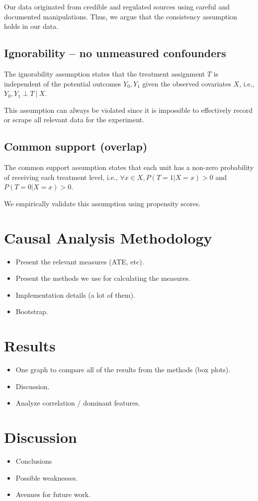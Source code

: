 \documentclass[11pt]{article}
\newcommand{\gur}[1]{{\color{teal}{Gur: #1}}}
\begin{document}
Our data originated from credible and regulated sources using careful and documented manipulations. Thus, we argue that the consistency assumption holds in our data.

\subsection{Ignorability – no unmeasured confounders}

The ignorability assumption states that the treatment assignment $T$ is independent of the potential outcomes $Y_0, Y_1$ given the observed covariates $X$, i.e., $Y_0, Y_1 \perp T \ | \ X$. 

This assumption can always be violated since it is impossible to effectively record or scrape all relevant data for the experiment. \gur{Literature!}

\subsection{Common support (overlap)}

The common support assumption states that each unit has a non-zero probability of receiving each treatment level, i.e., $\forall x \in X, P(T=1|X=x) > 0$ and $P(T=0|X=x) > 0$.

We empirically validate this assumption using propensity scores.

\section{Causal Analysis Methodology}

\begin{itemize}
    \item Present the relevant measures (ATE, etc).
    \item Present the methods we use for calculating the measures.
    \item Implementation details (a lot of them).
    \item Bootstrap.
\end{itemize}

\section{Results}

\begin{itemize}
    \item One graph to compare all of the results from the methods (box plots).
    \item Discussion.
    \item Analyze correlation / dominant features.
\end{itemize}

\section{Discussion}

\begin{itemize}
    \item Conclusions
    \item Possible weaknesses.
    \item Avenues for future work.
\end{itemize}



\appendix
\end{document}
